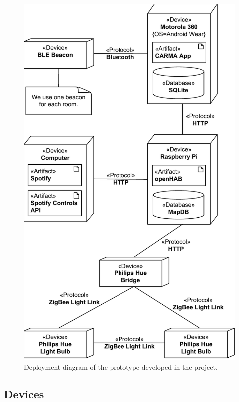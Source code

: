 \begin{figure}[H]
\centering
\includegraphics[height=0.95\textheight]{images/deployment-diagram}
\caption{Deployment diagram of the prototype developed in the project.}
\label{fig:implementation:deployment-diagram}
\end{figure}

\subsection{Devices}
\label{sec:implementation:status:devices}

